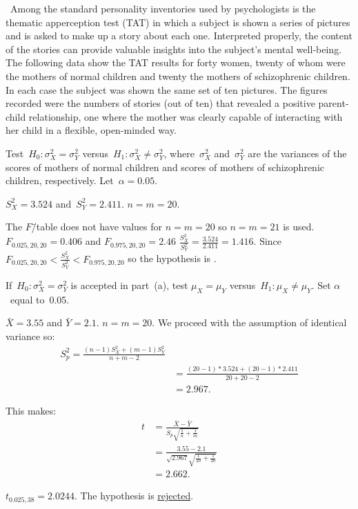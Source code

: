 \begin{problem}
  ~Among the standard personality inventories used by psychologists is the thematic apperception test (TAT) in which a subject is shown a series of pictures and is asked to make up a story about each one. Interpreted properly, the content of the stories can provide valuable insights into the subject’s mental well-being. The following data show the TAT results for forty women, twenty of whom were the mothers of normal children and twenty the mothers of schizophrenic children. In each case the subject was shown the same set of ten pictures. The figures recorded were the numbers of stories (out of ten) that revealed a positive parent-child relationship, one where the mother was clearly capable of interacting with her child in a flexible, open-minded way.
\end{problem}

\begin{subproblem}
  Test~${H_0 : \sigma_{X}^{2} = \sigma_{Y}^{2}}$ versus~${H_1 : \sigma_{X}^{2} \ne \sigma_{Y}^{2}}$, where~$\sigma_{X}^2$ and~$\sigma_{Y}^{2}$ are the variances of the scores of mothers of normal children and scores of mothers of schizophrenic children, respectively. Let~${\alpha = 0.05}$.
\end{subproblem}

${S^{2}_{X} = 3.524}$ and~${S^{2}_Y = 2.411}$.  ${n = m = 20}$.

The $F$\=/table does not have values for ${n=m=20}$ so ${n=m=21}$ is used. ${F_{0.025,20,20} = 0.406}$ and ${F_{0.975,20,20} = 2.46}$  ${\frac{S^{2}_{X}}{S^{2}_{Y}} = \frac{3.524}{2.411} = 1.416}$.  Since ${F_{0.025,20,20} < \frac{S^{2}_{X}}{S^{2}_{Y}} < F_{0.975,20,20}}$ so the hypothesis is .

\begin{subproblem}
  If~${H_0: \sigma_{X}^{2} = \sigma_{Y}^{2}}$ is accepted in part~(a), test ${\mu_{X} = \mu_{Y}}$ versus~${H_{1}: \mu_{X} \ne \mu_{Y}}$. Set $\alpha$~equal to~0.05.
\end{subproblem}

${\bar{X} = 3.55}$ and ${\bar{Y} = 2.1}$.  ${n = m = 20}$.  We proceed with the assumption of identical variance so:
\begin{align}
  S^{2}_{p} = \frac{(n-1)S^{2}_{X} + (m-1)S^{2}_{Y}}{n + m - 2} \\
            &= \frac{(20 - 1) * 3.524+ (20 - 1) * 2.411}{20 + 20 - 2} \\
            &= 2.967 \text{.}
\end{align}

This makes:
\begin{align}
  t &= \frac{\bar{X} - \bar{Y}}{S_{p} \sqrt{\frac{1}{n} + \frac{1}{m}}} \\
    &=  \frac{3.55 - 2.1}{\sqrt{2.967} \sqrt{\frac{1}{20} + \frac{1}{20}}} \\
    &= 2.662\text{.}
\end{align}

${t_{0.025,38} = 2.0244}$.  The hypothesis is \underline{rejected}.
